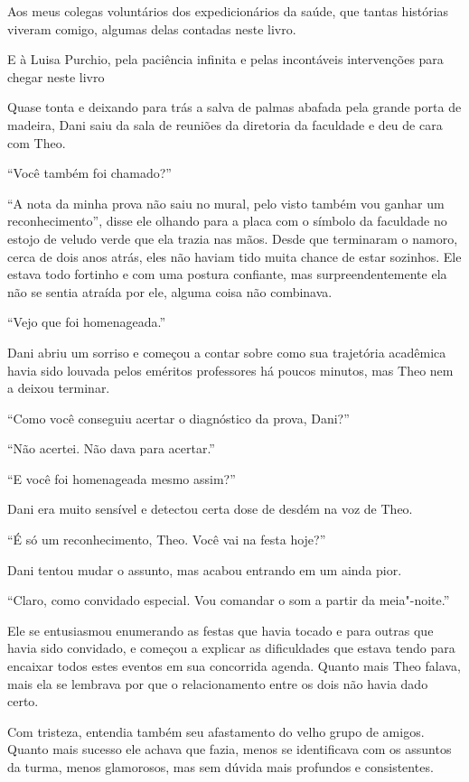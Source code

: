 Aos meus colegas voluntários dos expedicionários da saúde, que tantas histórias viveram comigo, algumas delas contadas neste livro.

E à Luisa Purchio, pela paciência infinita e pelas incontáveis intervenções para chegar neste livro



Quase tonta e deixando para trás a salva de palmas abafada pela grande
porta de madeira, Dani saiu da sala de reuniões da diretoria da
faculdade e deu de cara com Theo.

``Você também foi chamado?''

``A nota da minha prova não saiu no mural, pelo visto também vou ganhar
um reconhecimento'', disse ele olhando para a placa com o símbolo da
faculdade no estojo de veludo verde que ela trazia nas mãos. Desde que
terminaram o namoro, cerca de dois anos atrás, eles não haviam tido
muita chance de estar sozinhos. Ele estava todo fortinho e com uma postura
confiante, mas surpreendentemente ela não se sentia atraída por ele,
alguma coisa não combinava.

``Vejo que foi homenageada.''

Dani abriu um sorriso e começou a contar sobre como sua trajetória
acadêmica havia sido louvada pelos eméritos professores há poucos
minutos, mas Theo nem a deixou terminar.

``Como você conseguiu acertar o diagnóstico da prova, Dani?''

``Não acertei. Não dava para acertar.''

``E você foi homenageada mesmo assim?''

Dani era muito sensível e detectou certa dose de desdém na voz de Theo.

``É só um reconhecimento, Theo. Você vai na festa hoje?''

Dani tentou mudar o assunto, mas acabou entrando em um ainda pior.

``Claro, como convidado especial. Vou comandar o som a partir da
meia"-noite.''

Ele se entusiasmou enumerando as festas que havia tocado e para outras
que havia sido convidado, e começou a explicar as dificuldades que
estava tendo para encaixar todos estes eventos em sua concorrida agenda.
Quanto mais Theo falava, mais ela se lembrava por que o relacionamento
entre os dois não havia dado certo.

Com tristeza, entendia também seu afastamento do velho grupo de amigos.
Quanto mais sucesso ele achava que fazia, menos se identificava com
os assuntos da turma, menos glamorosos, mas sem dúvida mais profundos e
consistentes.

